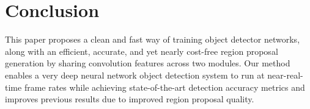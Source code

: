 \documentclass[conference]{IEEEtran}
\begin{document}
\section{Conclusion}
This paper proposes a clean and fast way of training object detector networks, along with an efficient, accurate, and yet nearly cost-free region proposal generation by sharing convolution features across two modules. Our method enables a very deep neural network object detection system to run at near-real-time frame rates while achieving state-of-the-art detection accuracy metrics and improves previous results due to improved region proposal quality.

\end{document}
